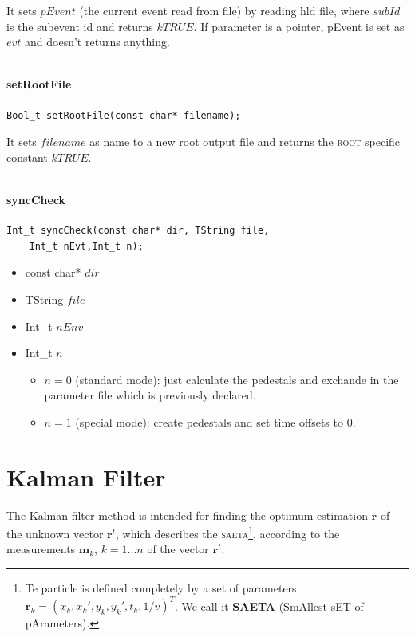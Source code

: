 \documentclass[a4paper]{book}
\let\vec\mathbf  %
\begin{document}
It sets $pEvent$ (the current event read from file) by reading hld file, where $subId$ is the subevent id and returns $kTRUE$. If parameter is a pointer, pEvent is set as $evt$ and doesn't returns anything.

\[\]

\subsubsection{setRootFile}

\begin{lstlisting}
Bool_t setRootFile(const char* filename);
\end{lstlisting}

It sets $filename$ as name to a new root output file and returns the \textsc{root} specific constant $kTRUE$.

\[\]


\subsubsection{syncCheck}

\begin{lstlisting}
Int_t syncCheck(const char* dir, TString file, 
	Int_t nEvt,Int_t n);
\end{lstlisting}

\begin{itemize}
	\item const char* $dir$
	\item TString $file$
	\item Int\_t $nEnv$
	\item Int\_t $n$
	\begin{itemize}
		\item $n = 0$ (standard mode): just calculate the pedestals and exchande in the parameter file which is previously declared.
		\item $n = 1$ (special mode):  create pedestals and set time offsets to 0.
	\end{itemize}
	
\end{itemize}

\chapter{Kalman Filter}

The Kalman filter method is intended for finding the optimum estimation $\vec{r}$ of the unknown vector $\vec{r}^t$, which describes the \textsc{saeta}\footnote{Te particle is defined completely by a set of parameters $\vec{r}_k = (x_k, x_k', y_k, y_k', t_k, 1/v)^T$. We call it \textbf{SAETA} (SmAllest sET of pArameters).}, according to the measurements $\vec{m}_k$, $k = 1 ... n$ of the vector $\vec{r}^t$.
\end{document}
